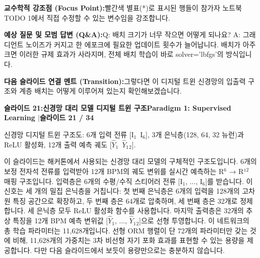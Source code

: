\documentclass[11pt,a4paper]{article}
\begin{document}
\vspace{0.2em}
\begin{tcolorbox}[colback=lightbg,colframe=bordergray,left=6pt,right=6pt,top=3pt,bottom=3pt,boxrule=0.6pt,arc=2.5pt]
\small
\noindent\textbf{\color{navy}교수학적 강조점 (Focus Point):}\enspace 빨간색 별표(*)로 표시된 행들이 참가자 노트북 TODO 1에서 직접 수정할 수 있는 변수임을 강조합니다.\par\vspace{0.3em}
\noindent\textbf{\color{successgreen}예상 질문 및 모범 답변 (Q\&A):}\enspace Q: 배치 크기가 너무 작으면 어떻게 되나요? A: 그래디언트 노이즈가 커지고 한 에포크에 필요한 업데이트 횟수가 늘어납니다. 배치가 아주 크면 이러한 규제 효과가 사라지며, 전체 배치 학습이 바로 solver='lbfgs'의 방식입니다.\par\vspace{0.3em}
\noindent\textbf{\color{accent}다음 슬라이드 연결 멘트 (Transition):}\enspace 그렇다면 이 디지털 트윈 신경망의 입출력 구조와 계층 배치는 어떻게 이루어져 있는지 확인해보겠습니다.
\end{tcolorbox}
\clearpage
\hypertarget{slide.21}{}
{}
\noindent\begin{tcolorbox}[colback=navy,colframe=navy,left=6pt,right=6pt,top=3pt,bottom=3pt,boxrule=0pt,arc=2pt]
{\large\bfseries\color{white}슬라이드 21:\enspace 신경망 대리 모델 디지털 트윈 구조}\hfill{\footnotesize\bfseries\color{white!85!lightbg}Paradigm 1: Supervised Learning \enspace$|$\enspace 슬라이드 21 / 34}
\end{tcolorbox}
\vspace{0.2em}
\begin{tcolorbox}[colback=lightbg,colframe=bordergray,title={\footnotesize\bfseries\color{darkgray}슬라이드 시각 구성 요약},fontupper=\small,left=6pt,right=6pt,top=2.5pt,bottom=2.5pt,boxrule=0.6pt,arc=2.5pt]
신경망 디지털 트윈 구조도: 6개 입력 전류 [I$_1$~I$_6$], 3개 은닉층(128, 64, 32 뉴런)과 ReLU 활성화, 12개 출력 예측 궤도 [$\hat{Y}$$_1$~$\hat{Y}$$_1$$_2$].
\end{tcolorbox}
\vspace{0.2em}
\begin{tcolorbox}[colback=white,colframe=primaryblue,title={\footnotesize\bfseries\color{white}발표자 구두 대본 (Spoken Script)},fontupper=\small,left=6pt,right=6pt,top=3pt,bottom=3pt,boxrule=0.8pt,arc=2.5pt]
이 슬라이드는 해커톤에서 사용되는 신경망 대리 모델의 구체적인 구조도입니다. 6개의 보정 전자석 전류를 입력받아 12개 BPM의 궤도 변위를 실시간 예측하는 R$^6$ → R¹$^2$ 매핑 구조입니다. 입력층은 6개의 수평/수직 스티어러 전류 [I$_1$, ..., I$_6$]를 받습니다. 이 신호는 세 개의 밀집 은닉층을 거칩니다: 첫 번째 은닉층은 6개의 입력을 128개의 고차원 특징 공간으로 확장하고, 두 번째 층은 64개로 압축하며, 세 번째 층은 32개로 정제합니다. 세 은닉층 모두 ReLU 활성화 함수를 사용합니다. 마지막 출력층은 32개의 추상 특징을 12개 BPM 예측 변위값 [$\hat{Y}$$_1$, ..., $\hat{Y}$$_1$$_2$]으로 선형 투영합니다. 이 네트워크의 총 학습 파라미터는 11,628개입니다. 선형 ORM 행렬이 단 72개의 파라미터만 갖는 것에 비해, 11,628개의 가중치는 3차 비선형 자기 포화 효과를 표현할 수 있는 용량을 제공합니다. 다만 다음 슬라이드에서 보듯이 용량만으로는 충분하지 않습니다.
\end{tcolorbox}
\end{document}
